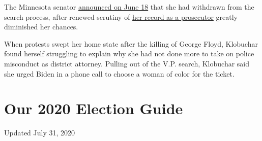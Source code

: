 The Minnesota senator
\href{https://www.nytimes.com/2020/06/18/us/politics/amy-klobuchar-biden-vice-president.html}{announced
on June 18} that she had withdrawn from the search process, after
renewed scrutiny of
\href{https://www.nytimes.com/2020/05/29/us/politics/klobuchar-minneapolis-george-floyd.html}{her
record as a prosecutor} greatly diminished her chances.

When protests swept her home state after the killing of George Floyd,
Klobuchar found herself struggling to explain why she had not done more
to take on police misconduct as district attorney. Pulling out of the
V.P. search, Klobuchar said she urged Biden in a phone call to choose a
woman of color for the ticket.

\hypertarget{our-2020-election-guide}{%
\section{Our 2020 Election Guide}\label{our-2020-election-guide}}

Updated July 31, 2020

